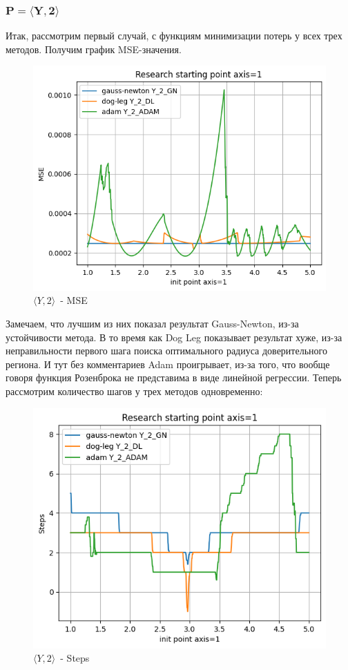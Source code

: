 \documentclass[12pt, a4paper, oneside, final]{article}
\begin{document}
	\subsubsection*{$\mathbf{P = \langle Y, 2 \rangle}$}
	Итак, рассмотрим первый случай, с функциям минимизации потерь у всех трех методов.
	Получим график MSE-значения.
	\begin{figure}[H]
		\centering
		\includegraphics[scale = 0.55]{Image/T1_Y_2_MSE.png}
		\caption*{$\langle Y, 2 \rangle$~- MSE}
	\end{figure}
	Замечаем, что лучшим из них показал результат Gauss-Newton, из-за устойчивости метода.
	В то время как Dog Leg показывает результат хуже, из-за неправильности первого шага поиска оптимального радиуса доверительного региона.
	И тут без комментариев Adam проигрывает, из-за того, что вообще говоря функция Розенброка не представима в виде линейной регрессии.
	Теперь рассмотрим количество шагов у трех методов одновременно:
	\begin{figure}[H]
		\centering
		\includegraphics[scale = 0.55]{Image/T1_Y_2_STEPS.png}
		\caption*{$\langle Y, 2 \rangle$~- Steps}
	\end{figure}
\end{document}
